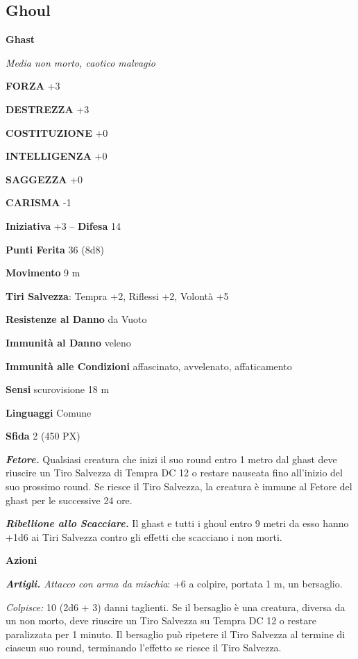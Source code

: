 \begin{multicols}{2}
\subsection{Ghoul}

\medskip{}\textbf{Ghast}

\textit{Media non morto, caotico malvagio}

\textbf{FORZA} +3

\textbf{DESTREZZA} +3

\textbf{COSTITUZIONE} +0

\textbf{INTELLIGENZA} +0

\textbf{SAGGEZZA} +0

\textbf{CARISMA} -1

\textbf{Iniziativa} +3 -- \textbf{Difesa} 14

\textbf{Punti Ferita} 36 (8d8)

\textbf{Movimento} 9 m

\textbf{Tiri Salvezza}: Tempra +2, Riflessi +2, Volontà +5

\textbf{Resistenze al Danno} da Vuoto

\textbf{Immunità al Danno} veleno

\textbf{Immunità alle Condizioni} affascinato, avvelenato, affaticamento

\textbf{Sensi} scurovisione 18 m

\textbf{Linguaggi} Comune

\textbf{Sfida} 2 (450 PX)

\textit{\textbf{Fetore.}} Qualsiasi creatura che inizi il suo round entro 1 metro dal ghast deve riuscire un Tiro Salvezza di Tempra DC 12 o restare nauseata fino all'inizio del suo prossimo round. Se riesce il Tiro Salvezza, la creatura è immune al Fetore del ghast per le successive 24
ore.

\textit{\textbf{Ribellione allo Scacciare.}} Il ghast e tutti i ghoul entro 9 metri da esso hanno +1d6 ai Tiri Salvezza contro gli effetti che scacciano i non morti.

\textbf{Azioni}

\textit{\textbf{Artigli.} Attacco con arma da mischia}: +6 a colpire, portata 1 m, un bersaglio.

\textit{Colpisce:} 10 (2d6 + 3) danni taglienti. Se il bersaglio è una creatura, diversa da un non morto, deve riuscire un Tiro Salvezza su Tempra DC 12 o restare paralizzata per 1 minuto. Il bersaglio può ripetere il Tiro Salvezza al termine di ciascun suo round, terminando l'effetto se riesce il Tiro Salvezza.


\end{multicols}
